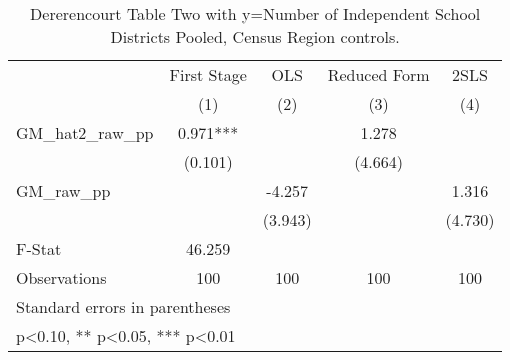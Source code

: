 \begin{table}[htbp]\centering
\def\sym#1{\ifmmode^{#1}\else\(^{#1}\)\fi}
\caption{Dererencourt Table Two with y=Number of Independent School Districts  Pooled, Census Region controls.}
\begin{tabular}{l*{4}{c}}
\toprule
                    & First Stage   &         OLS   &Reduced Form   &        2SLS   \\
                    &\multicolumn{1}{c}{(1)}   &\multicolumn{1}{c}{(2)}   &\multicolumn{1}{c}{(3)}   &\multicolumn{1}{c}{(4)}   \\
\midrule
GM\_hat2\_raw\_pp      &       0.971***&               &       1.278   &               \\
                    &     (0.101)   &               &     (4.664)   &               \\
\addlinespace
GM\_raw\_pp           &               &      -4.257   &               &       1.316   \\
                    &               &     (3.943)   &               &     (4.730)   \\
\midrule
F-Stat              &      46.259   &               &               &               \\
Observations        &         100   &         100   &         100   &         100   \\
\bottomrule
\multicolumn{5}{l}{\footnotesize Standard errors in parentheses}\\
\multicolumn{5}{l}{\footnotesize * p<0.10, ** p<0.05, *** p<0.01}\\
\end{tabular}
\end{table}
